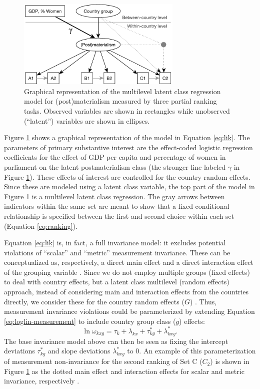 \documentclass[letterpaper,12pt]{article}
\begin{document}
\begin{figure}\centering
	\includegraphics[width=0.7\textwidth]{figures/model}
	\caption{\label{fig:model}Graphical representation of 
	the multilevel latent class regression model for 
	(post)materialism measured by three partial ranking tasks. Observed variables are shown in rectangles while unobserved (``latent'') variables are shown in ellipses.	}
\end{figure}


Figure \ref{fig:model} shows a graphical representation of the model in Equation \ref{eq:lik}. 
The parameters of primary substantive interest are the effect-coded logistic regression coefficients for the effect of GDP per capita and percentage of women in parliament on the latent postmaterialism class (the stronger line labeled $\gamma$ in Figure \ref{fig:model}). 
These effects of interest are controlled for the country random effects. Since these are modeled using a latent class variable, the top part of the model in Figure \ref{fig:model} is a multilevel latent class regression. The gray arrows between indicators within the same set are meant to show that a fixed conditional relationship is specified between the first and second choice within each set (Equation \ref{eq:ranking}). 

Equation \ref{eq:lik} is, in fact, a full invariance model: it excludes potential violations of ``scalar''  and ``metric'' measurement invariance. These can be conceptualized as, respectively, a direct main effect and a direct interaction effect of the grouping variable 
\citep{mellenbergh1989item,kankaras2010testing,kankaras2011measurement}. Since we do not employ multiple groups (fixed effects) to deal with country effects, but a latent class multilevel (random effects) approach, instead of considering main and interaction effects from the countries directly, we consider these for the country random effects ($G$)  \citep[see][]{dejong2007relaxing,fox2011random}.
Thus, measurement invariance violations could be parameterized by extending Equation  \ref{eq:loglin-measurement} to include country group class ($g$) effects:
\begin{equation}
	\ln \omega_{k x g} = \tau_{k} + \lambda_{k x} + 
		\tau^{*}_{k g} + \lambda^{*}_{k x g}.
			\label{eq:loglin-measurement-noninvariant}
\end{equation}
The base invariance model above can then be seen as fixing the intercept deviations $\tau^{*}_{k g}$  and slope deviations $\lambda^{*}_{k x g}$ to 0.  An example of this parameterization of measurement non-invariance for 
the second ranking of Set C ($C_2$) is shown in Figure \ref{fig:model} as the dotted main effect and interaction effects for scalar and metric invariance, respectively . 
\end{document}

